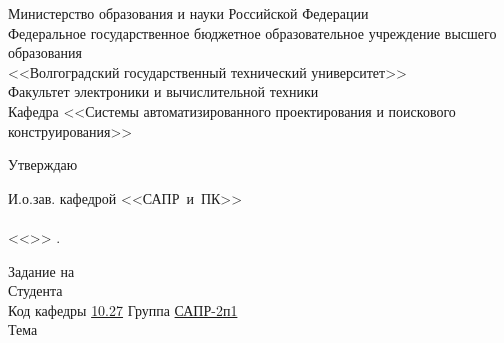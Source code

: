 \begin{titlepage}
    \begin{center}
        Министерство образования и науки Российской Федерации \\
        \vspace{.5cm}
        Федеральное государственное бюджетное образовательное учреждение высшего образования\\
        <<Волгоградский государственный технический университет>>\\
        Факультет электроники и вычислительной техники\\
        \vspace{.5cm}
        Кафедра <<Системы автоматизированного проектирования и поискового конструирования>>
        \vspace{.5cm}
    \end{center}
    \begin{flushright}
        \begin{center}
            \hspace*{10.5em}Утверждаю
        \end{center}
        И.о.зав. кафедрой <<САПР~и~ПК>>\\
        \quad{}\\
        <<\underline{\hspace{2em}}>> \underline{\hspace{8em}} \the{}.
    \end{flushright}
    Задание на 
        {}\\
    Студента \\
    Код кафедры \vspace{1em}\underline{\hspace{2em}10.27\hspace{5em}}\quad\qquad
    Группа \underline{\hspace{3em}САПР-2п1\hspace{4.8em}}\\
    Тема \vspace{0.5em}\underline{}\\

\end{titlepage}

